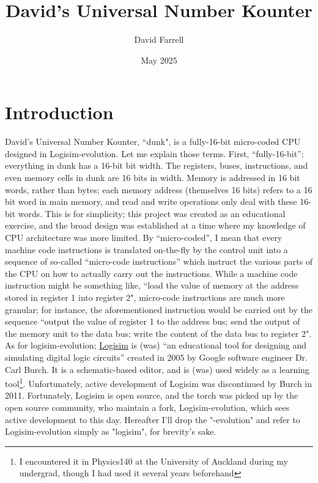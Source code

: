\documentclass{article}
\title{David's Universal Number Kounter}
\author{David Farrell}
\date{May 2025}
\begin{document}
\maketitle

\section{Introduction}

David's Universal Number Kounter, ``dunk", is a fully-16-bit micro-coded CPU designed in Logisim-evolution. Let me explain those terms. First, ``fully-16-bit'': everything in dunk has a 16-bit bit width. The registers, buses, instructions, and even memory cells in dunk are 16 bits in width. Memory is addressed in 16 bit words, rather than bytes; each memory address (themselves 16 bits) refers to a 16 bit word in main memory, and read and write operations only deal with these 16-bit words. This is for simplicity; this project was created as an educational exercise, and the broad design was established at a time where my knowledge of CPU architecture was more limited. By ``micro-coded'', I mean that every machine code instructions is translated on-the-fly by the control unit into a sequence of so-called ``micro-code instructions'' which instruct the various parts of the CPU on how to actually carry out the instructions. While a machine code instruction might be something like, ``load the value of memory at the address stored in register 1 into register 2", micro-code instructions are much more granular; for instance, the aforementioned instruction would be carried out by the sequence ``output the value of register 1 to the address bus; send the output of the memory unit to the data bus; write the content of the data bus to register 2". As for logisim-evolution; \href{https://cburch.com/logisim/docs/2.0b17/index.html}{Logisim} is (was) ``an educational tool for designing and simulating digital logic circuits'' created in 2005 by Google software engineer Dr. Carl Burch. It is a schematic-based editor, and is (was) used widely as a learning tool\footnote{I encountered it in Physics140 at the University of Auckland during my undergrad, though I had used it several years beforehand}. Unfortunately, active development of Logisim was discontinued by Burch in 2011. Fortunately, Logisim is open source, and the torch was picked up by the open source community, who maintain a fork, Logisim-evolution, which sees active development to this day. Hereafter I'll drop the "-evolution" and refer to Logisim-evolution simply as "logisim", for brevity's sake. 
\end{document}
